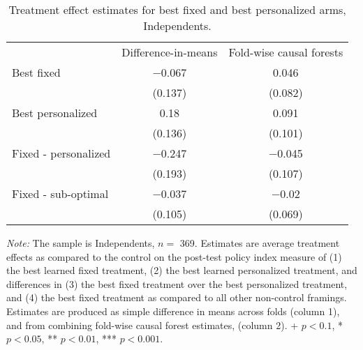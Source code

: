 \begin{table*}

\caption{\label{tab:unnamed-chunk-21}Treatment effect estimates for best fixed and best personalized arms, Independents. \label{tab:best_framing_independents}}
\centering
\begin{threeparttable}
\begin{tabular}[t]{lcc}
\toprule
 & Difference-in-means & Fold-wise causal forests\\
\cmidrule(lr){2-2} \cmidrule(lr){3-3}
Best fixed & \num{-0.067} & \num{0.046}\\
 & (\num{0.137}) & (\num{0.082})\\
\addlinespace
Best personalized & \num{0.18} & \num{0.091}\\
 & (\num{0.136}) & (\num{0.101})\\
\cmidrule(lr){2-2} \cmidrule(lr){3-3}
\addlinespace
Fixed - personalized & \num{-0.247} & \num{-0.045}\\
 & (\num{0.193}) & (\num{0.107})\\
\addlinespace
Fixed - sub-optimal & \num{-0.037} & \num{-0.02}\\
 & (\num{0.105}) & (\num{0.069})\\
\bottomrule
\end{tabular}
\begin{tablenotes}
\item \footnotesize \textit{Note:} The sample is Independents, $n = $ \num{369}. Estimates are average treatment effects as compared to the control on the post-test policy index measure of (1) the best learned fixed treatment, (2) the best learned personalized treatment, and differences in (3) the best fixed treatment over the best personalized treatment, and (4) the best fixed treatment as compared to all other non-control framings. Estimates are produced as simple difference in means across folds (column 1), and from combining fold-wise causal forest estimates, (column 2). + $p < 0.1$, * $p < 0.05$, ** $p < 0.01$, *** $p < 0.001$.
\end{tablenotes}
\end{threeparttable}
\end{table*}
